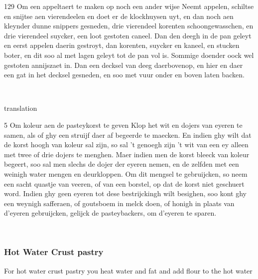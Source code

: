 \documentclass[a4paper]{article}
\begin{document}
\medskip
\begin{minipage}{.45\textwidth}
129 Om een appeltaert te maken op noch een ander wijse
Neemt appelen, schiltse en snijtse aen vierendeelen en doet er de klockhuysen uyt, en dan noch aen kleynder dunne snippers gesneden, drie vierendeel korenten schoongewasschen, en drie vierendeel suycker, een loot gestoten caneel. Dan den deegh in de pan geleyt en eerst appelen daerin gestroyt, dan korenten, suycker en kaneel, en stucken boter, en dit soo al met lagen geleyt tot de pan vol is. Sommige doender oock wel gestoten annijszaet in. Dan een decksel van deeg daerbovenop, en hier en daer een gat in het decksel gesneden, en soo met vuur onder en boven laten backen.	 \cite{vk}
\end{minipage}
\begin{minipage}{0.05\textwidth}
\ \ \ 
\end{minipage}
\begin{minipage}{.45\textwidth}
translation
\end{minipage}	






 
 
 \medskip
\begin{minipage}{.45\textwidth}
{5 Om koleur aen de pasteykorst te geven}
Klop het wit en dojers van eyeren te samen, als of ghy een struijf daer af begeerde te maecken. En indien ghy wilt dat de korst hoogh van koleur sal zijn, so sal ’t genoegh zijn ’t wit van een ey alleen met twee of drie dojers te menghen. Maer indien men de korst bleeck van koleur begeert, soo sal men slechs de dojer der eyeren nemen, en de zelfden met een weinigh water mengen en deurkloppen.
Om dit mengsel te gebruijcken, so neem een sacht quastje van veeren, of van een borstel, op dat de korst niet geschuert word. 
Indien ghy geen eyeren tot dese bestrijckingh wilt besighen, soo kont ghy een weynigh safferaen, of goutsboem in melck doen, of honigh in plaats van d’eyeren gebruijcken, gelijck de pasteybackers, om d’eyeren te sparen. \cite{hp}
\end{minipage}
\begin{minipage}{0.05\textwidth}
\ \ \ 
\end{minipage}
\begin{minipage}{.45\textwidth}
\end{minipage}

\subsubsection{Hot Water Crust pastry}
For hot water crust pastry you heat water and fat and add flour to the hot water
\end{document}
